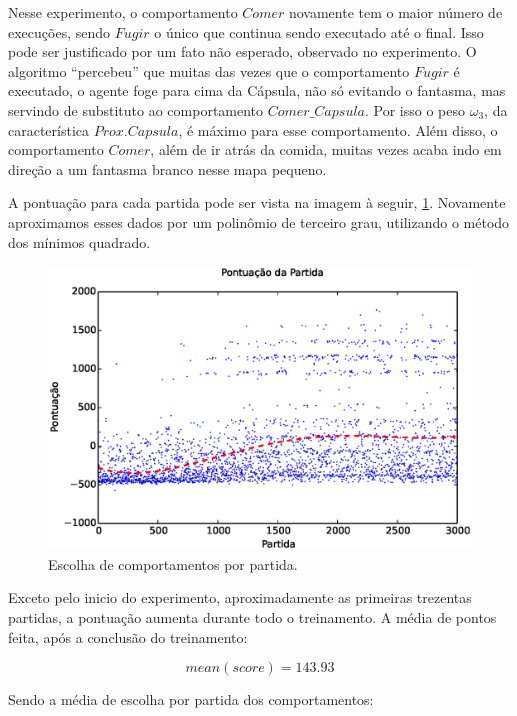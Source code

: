 Nesse experimento, o comportamento $ Comer $ novamente tem o maior número de execuções, sendo $ Fugir $ o único que continua sendo executado até o final. Isso pode ser justificado por um fato não esperado, observado no experimento. O algoritmo ``percebeu'' que muitas das vezes que o comportamento $ Fugir $ é executado, o agente foge para cima da Cápsula, não só evitando o fantasma, mas servindo de substituto ao comportamento $ Comer\_Capsula $. Por isso o peso $ \omega_3 $, da característica $ Prox. Capsula $, é máximo para esse comportamento. Além disso, o comportamento $ Comer $, além de ir atrás da comida, muitas vezes acaba indo em direção a um fantasma branco nesse mapa pequeno.

A pontuação para cada partida pode ser vista na imagem à seguir, \ref{img:5ComportamentosMapaPequeno:PontuacaoPorPartida}. Novamente aproximamos esses dados por um polinômio de terceiro grau, utilizando o método dos mínimos quadrado.

\begin{figure}[H]
    \centering
    \includegraphics[width=\linewidth]{images/5_behaviors_small_map/match_scores____pol}
    \caption{Escolha de comportamentos por partida.}
    \label{img:5ComportamentosMapaPequeno:PontuacaoPorPartida}
\end{figure}

Exceto pelo inicio do experimento, aproximadamente as primeiras trezentas partidas, a pontuação aumenta durante todo o treinamento. A média de pontos feita, após a conclusão do treinamento:

$$ mean \left( score \right) = 143.93 $$

Sendo a média de escolha por partida dos comportamentos:

